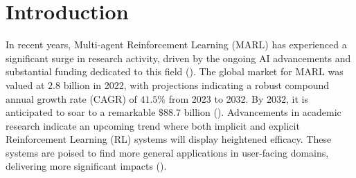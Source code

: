 \chapter{Introduction}
\label{ch:intro}

\vspace{-2.5em}

\noindent In recent years, Multi-agent Reinforcement Learning (MARL) has experienced a significant surge in research activity, driven by the ongoing AI advancements and substantial funding dedicated to this field (\cite{gilbert2023reward}). The global market for MARL was valued at $2.8$ billion in 2022, with projections indicating a robust compound annual growth rate (CAGR) of $41.5\%$ from 2023 to 2032. By 2032, it is anticipated to soar to a remarkable $\$88.7$ billion (\cite{reinforcementLearningMarket2023}). Advancements in academic research indicate an upcoming trend where both implicit and explicit Reinforcement Learning (RL) systems will display heightened efficacy. These systems are poised to find more general applications in user-facing domains, delivering more significant impacts (\cite{kirk2023personalisation}).

\bigskip

